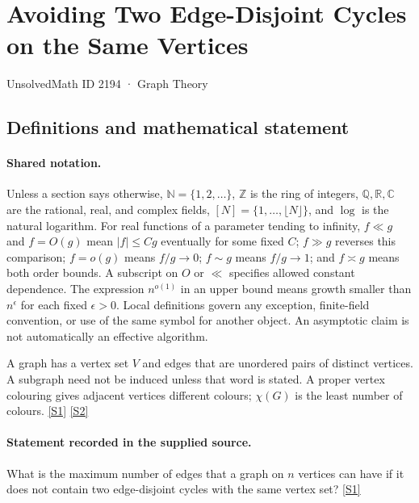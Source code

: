 \documentclass[11pt,a4paper]{article}
\newcommand{\N}{\mathbb{N}}
\newcommand{\Z}{\mathbb{Z}}
\newcommand{\Q}{\mathbb{Q}}
\newcommand{\R}{\mathbb{R}}
\newcommand{\C}{\mathbb{C}}
\newcommand{\sref}[2]{\hyperlink{source:#1:#2}{[S#2]}}
\begin{document}

\setcounter{section}{2193}

\section{Avoiding Two Edge-Disjoint Cycles on the Same Vertices}\label{2194}

{\small\sffamily UnsolvedMath ID 2194 · Graph Theory}

\subsection{Definitions and mathematical statement}

\paragraph{Shared notation.}Unless a section says otherwise, $\N=\{1,2,\ldots\}$,
$\Z$ is the ring of integers, $\Q,\R,\C$ are the rational, real, and complex
fields, $[N]=\{1,\ldots,\lfloor N\rfloor\}$, and $\log$ is the natural
logarithm. For real functions of a parameter tending to infinity,
$f\ll g$ and $f=O(g)$ mean $|f|\leq Cg$ eventually for some fixed $C$;
$f\gg g$ reverses this comparison; $f=o(g)$ means $f/g\to0$;
$f\sim g$ means $f/g\to1$; and $f\asymp g$ means both order bounds.
A subscript on $O$ or $\ll$ specifies allowed constant dependence.
The expression $n^{o(1)}$ in an upper bound means growth smaller than
$n^\epsilon$ for each fixed $\epsilon>0$. Local definitions govern any
exception, finite-field convention, or use of the same symbol for another
object. An asymptotic claim is not automatically an effective algorithm.



A graph has a vertex set $V$ and edges that are unordered pairs of distinct vertices. A subgraph need not be induced unless that word is stated. A proper vertex colouring gives adjacent vertices different colours; $\chi(G)$ is the least number of colours. \sref{2194}{1} \sref{2194}{2}

\paragraph{Statement recorded in the supplied source.}
What is the maximum number of edges that a graph on $n$ vertices can have if it does not contain two edge-disjoint cycles with the same vertex set? \sref{2194}{1}
\end{document}
